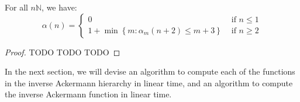 \begin{thm}
For all $n\mathbb{N}$, we have:
\begin{equation}
\alpha(n) = \begin{cases}
0 & \text{ if } n \le 1 \\
1 + \min\left\{ m: \alpha_m(n+2) \le m + 3 \right\} & \text{ if } n \ge 2
\end{cases}
\end{equation}
\end{thm}

\begin{proof}
TODO TODO TODO
\end{proof}

In the next section, we will devise an algorithm to compute each 
of the functions in the inverse Ackermann hierarchy in linear time, 
and an algorithm to compute the inverse Ackermann function in linear time.

\fi